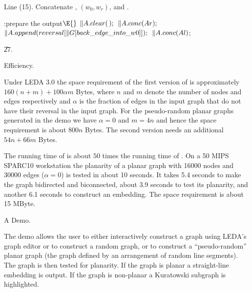 Line (15). Concatenate , $(w_0,w_r)$, and .

\Y\B\4:prepare the output\X${}\E{}$\6
$\|A.\\{clear}(\,);{}$\6
${}\|A.\\{conc}(\\{Ar});{}$\6
${}\|A.\\{append}(\\{reversal}[\|G[\\{back\_edge\_into\_w0}]]);{}$\6
${}\|A.\\{conc}(\\{Al}){}$;\par
\U27.\fi

Efficiency. \label{Efficiency}

Under LEDA 3.0 the space requirement of the first version of  is
approximately
$160 (n+m) +100 \alpha m$ Bytes, where $n$ and $m$ denote the number of nodes
and edges respectively and $\alpha$ is the fraction of edges in the input graph
that do not have their reversal in the input graph. For the pseudo-random
planar graphs generated in the demo we have $\alpha = 0$ and $m = 4n$ and hence
the
space requirement is about $800 n$ Bytes. The second version needs an
additional
$54n + 66m$ Bytes.

The running time of  is about $50$ times the running
time of . On a 50 MIPS SPARC10 workstation
the planarity of a
planar graph with 16000 nodes and 30000 edges ($\alpha = 0$) is tested in
about 10 seconds. It takes 5.4 seconds to make the graph bidirected and
biconnected, about 3.9 seconds to test its planarity, and
another 6.1 seconds to
construct an embedding. The space requirement is about 15 MByte.



\fi

A Demo. \label{demo}

The demo allows the user to either interactively construct a graph
using
LEDA's graph editor or to construct a random graph, or to
construct a ``pseudo-random'' planar graph
(the graph defined by an arrangement of random line segments). The graph is
then tested for
planarity. If the graph is planar a straight-line embedding is output. If the
graph is non-planar a Kuratowski subgraph is highlighted.

